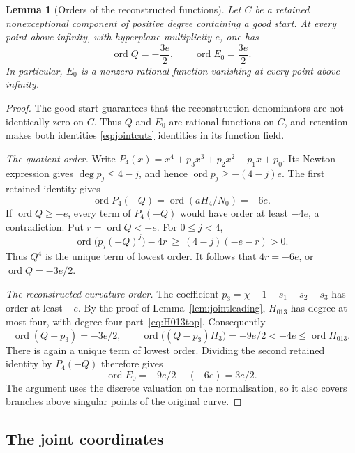 \documentclass[11pt]{article}
\newtheorem{lemma}[theorem]{Lemma}
\theoremstyle{definition}
\theoremstyle{remark}
\begin{document}
\begin{lemma}[Orders of the reconstructed functions]\label{lem:joint-infinity-orders}
Let $C$ be a retained nonexceptional component of positive degree
containing a good start.
At every point above infinity, with hyperplane multiplicity $e$, one has
\[
 \operatorname{ord}Q=-\frac{3e}{2},\qquad
 \operatorname{ord}E_0=\frac{3e}{2}.
\]
In particular, $E_0$ is a nonzero rational function vanishing at every
point above infinity.
\end{lemma}
\begin{proof}
The good start guarantees that the reconstruction denominators are
not identically zero on $C$. Thus $Q$ and $E_0$ are rational functions
on $C$, and retention makes both identities \eqref{eq:jointcuts}
identities in its function field.

\emph{The quotient order.}
Write
$P_4(x)=x^4+p_3x^3+p_2x^2+p_1x+p_0$.
Its Newton expression gives $\deg p_j\le4-j$, and hence
$\operatorname{ord}p_j\ge-(4-j)e$.
The first retained identity gives
\[
 \operatorname{ord}P_4(-Q)=\operatorname{ord}(aH_4/N_0)=-6e.
\]
If $\operatorname{ord}Q\ge-e$, every term of $P_4(-Q)$ would have order
at least $-4e$, a contradiction. Put $r=\operatorname{ord}Q<-e$.
For $0\le j<4$,
\[
 \operatorname{ord}\bigl(p_j(-Q)^j\bigr)-4r
 \ \ge\ (4-j)(-e-r)>0.
\]
Thus $Q^4$ is the unique term of lowest order. It follows that
$4r=-6e$, or $\operatorname{ord}Q=-3e/2$.

\emph{The reconstructed curvature order.}
The coefficient $p_3=\chi-1-s_1-s_2-s_3$ has order at least $-e$.
By the proof of Lemma~\ref{lem:jointleading}, $H_{013}$ has degree at most
four, with degree-four part~\eqref{eq:H013top}.
Consequently
\[
 \operatorname{ord}(Q-p_3)=-3e/2,\qquad
 \operatorname{ord}\bigl((Q-p_3)H_3\bigr)=-9e/2
       <-4e\le\operatorname{ord}H_{013}.
\]
There is again a unique term of lowest order. Dividing the second
retained identity by $P_4(-Q)$ therefore gives
\[
 \operatorname{ord}E_0=-9e/2-(-6e)=3e/2.
\]
The argument uses the discrete valuation on the normalisation, so it
also covers branches above singular points of the original curve.
\end{proof}

\subsection{The joint coordinates}\label{sec:jointcoords}
\end{document}
